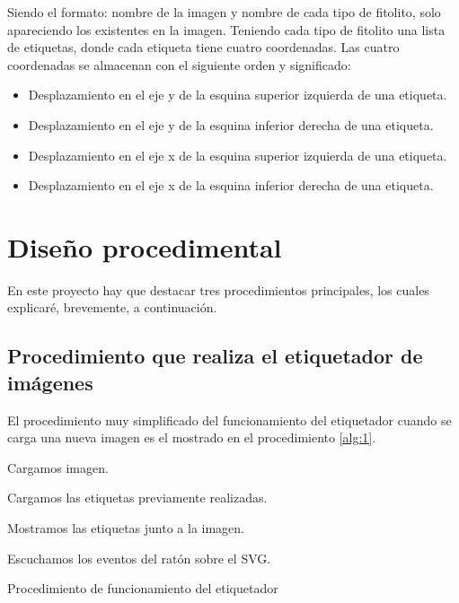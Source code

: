 Siendo el formato: nombre de la imagen y nombre de cada tipo de fitolito, solo apareciendo los existentes en la imagen. Teniendo cada tipo de fitolito una lista de etiquetas, donde cada etiqueta tiene cuatro coordenadas. Las cuatro coordenadas se almacenan con el siguiente orden y significado:

\begin{itemize}
	\item Desplazamiento en el eje y de la esquina superior izquierda de una etiqueta.
	\item  Desplazamiento en el eje y de la esquina inferior derecha de una etiqueta.
	\item Desplazamiento en el eje x de la esquina superior izquierda de una etiqueta.
	\item  Desplazamiento en el eje x de la esquina inferior derecha de una etiqueta.
\end{itemize}

\section{Diseño procedimental}

En este proyecto hay que destacar tres procedimientos principales, los cuales explicaré, brevemente, a continuación.

\subsection{Procedimiento que realiza el etiquetador de imágenes}

El procedimiento muy simplificado del funcionamiento del etiquetador cuando se carga una nueva imagen es el mostrado en el procedimiento \ref{alg:1}.

\begin{algorithm}
    	{
    	Cargamos imagen.
    	
    		{
    			Cargamos las etiquetas previamente realizadas.
    			
    			Mostramos las etiquetas junto a la imagen.
    		}
    	Escuchamos los eventos del ratón sobre el SVG.
    	}
    \caption{Procedimiento de funcionamiento del etiquetador}
    \label{alg:1}
\end{algorithm}

